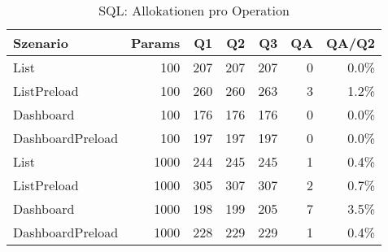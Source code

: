 \begin{table}[ht]
\centering
\caption{SQL: Allokationen pro Operation}
\begin{tabular}{lrrrrrr}
\toprule
Szenario & Params & Q1 & Q2 & Q3 & QA & QA/Q2 \\
\midrule
		List & 100 & 207 & 207 & 207 & 0 & 0.0\% \\
		ListPreload & 100 & 260 & 260 & 263 & 3 & 1.2\% \\
		Dashboard & 100 & 176 & 176 & 176 & 0 & 0.0\% \\
		DashboardPreload & 100 & 197 & 197 & 197 & 0 & 0.0\% \\
		List & 1000 & 244 & 245 & 245 & 1 & 0.4\% \\
		ListPreload & 1000 & 305 & 307 & 307 & 2 & 0.7\% \\
		Dashboard & 1000 & 198 & 199 & 205 & 7 & 3.5\% \\
		DashboardPreload & 1000 & 228 & 229 & 229 & 1 & 0.4\% \\
\bottomrule
\end{tabular}
\label{tab:benchmark_sql_allocsperop}
\end{table}
	